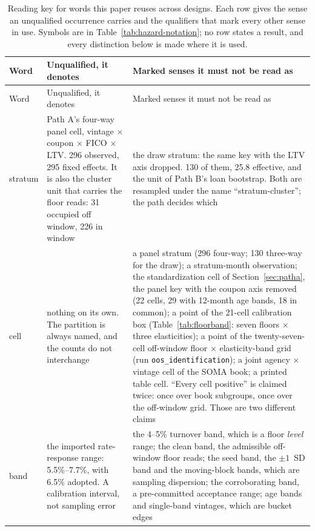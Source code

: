 \documentclass[12pt]{article}
\begin{document}
\begin{table}[H]
\begin{threeparttable}
\begin{tablenotes}[flushleft]
\end{tablenotes}
\end{threeparttable}
\end{table}

{\footnotesize
\begin{longtable}{@{}p{1.5cm}p{6.2cm}p{6.2cm}@{}}
\caption{Reading key for words this paper reuses across designs. Each row gives the sense an unqualified occurrence carries and the qualifiers that mark every other sense in use. Symbols are in Table~\ref{tab:hazard-notation}; no row states a result, and every distinction below is made where it is used.}
\label{tab:terminology}\\
\toprule
Word & Unqualified, it denotes & Marked senses it must not be read as \\
\midrule
\endfirsthead
\toprule
Word & Unqualified, it denotes & Marked senses it must not be read as \\
\midrule
\endhead
stratum & Path A's four-way panel cell, vintage $\times$ coupon $\times$ FICO $\times$ LTV. 296 observed, 295 fixed effects. It is also the cluster unit that carries the floor reads: 31 occupied off window, 226 in window & the draw stratum: the same key with the LTV axis dropped. 130 of them, 25.8 effective, and the unit of Path B's loan bootstrap. Both are resampled under the name ``stratum-cluster''; the path decides which \\
cell & nothing on its own. The partition is always named, and the counts do not interchange & a panel stratum (296 four-way; 130 three-way for the draw); a stratum-month observation; the standardization cell of Section~\ref{sec:patha}, the panel key with the coupon axis removed (22 cells, 29 with 12-month age bands, 18 in common); a point of the 21-cell calibration box (Table~\ref{tab:floorband}: seven floors $\times$ three elasticities); a point of the twenty-seven-cell off-window floor $\times$ elasticity-band grid (run \texttt{oos\_identification}); a joint agency $\times$ vintage cell of the SOMA book; a printed table cell. ``Every cell positive'' is claimed twice: once over book subgroups, once over the off-window grid. Those are two different claims \\
band & the imported rate-response range: 5.5\%--7.7\%, with 6.5\% adopted. A calibration interval, not sampling error & the 4--5\% turnover band, which is a floor \emph{level} range; the clean band, the admissible off-window floor reads; the seed band, the $\pm 1$~SD band and the moving-block bands, which are sampling dispersion; the corroborating band, a pre-committed acceptance range; age bands and single-band vintages, which are bucket edges \\

\end{longtable}}
\end{document}
